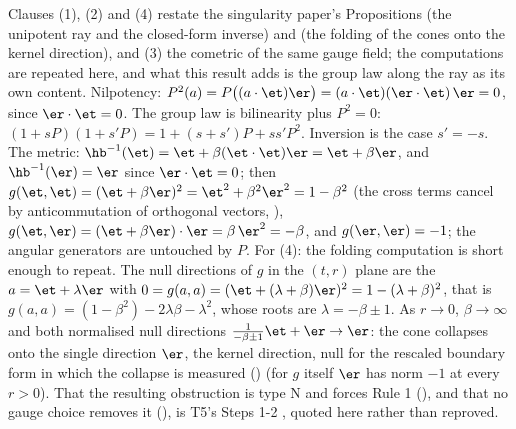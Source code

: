 Clauses (1), (2) and (4) restate the singularity paper's Propositions  (the unipotent ray and the closed-form inverse) and  (the folding of the cones onto the kernel direction), and (3) the cometric of the same gauge field; the computations are repeated here, and what this result adds is the group law along the ray as its own content. Nilpotency: $P^2(a) = P\bigl((a\cdot\et)\er\bigr) = (a\cdot\et)(\er\cdot\et)\,\er = 0$, since $\er \cdot \et = 0$. The group law is bilinearity plus $P^2 = 0$: $(1 + sP)(1 + s'P) = 1 + (s + s')P + ss'P^2$. Inversion is the case $s' = -s$. The metric: $\hb^{-1}(\et) = \et + \beta(\et\cdot\et)\er = \et + \beta\er$, and $\hb^{-1}(\er) = \er$ since $\er \cdot \et = 0$; then $g(\et,\et) = (\et + \beta\er)^2 = \et^2 + \beta^2\er^2 = 1 - \beta^2$ (the cross terms cancel by anticommutation of orthogonal vectors, ), $g(\et,\er) = (\et + \beta\er)\cdot\er = \beta\,\er^2 = -\beta$, and $g(\er,\er) = -1$; the angular generators are untouched by $P$. For (4): the folding computation is short enough to repeat. The null directions of $g$ in the $(t,r)$ plane are the $a = \et + \lambda\er$ with $0 = g(a,a) = (\et + (\lambda + \beta)\er)^{2} = 1 - (\lambda + \beta)^{2}$, that is $g(a,a) = (1-\beta^2) - 2\lambda\beta - \lambda^2$, whose roots are $\lambda = -\beta \pm 1$. As $r \to 0$, $\beta \to \infty$ and both normalised null directions $\tfrac{1}{-\beta\pm1}\et + \er \to \er$: the cone collapses onto the single direction $\er$, the kernel direction, null for the rescaled boundary form in which the collapse is measured \cite[Prop.~2.6]{ButlerT5} () (for $g$ itself $\er$ has norm $-1$ at every $r > 0$). That the resulting obstruction is type N and forces Rule 1 (), and that no gauge choice removes it (), is T5's Steps 1-2 \cite{ButlerT5}, quoted here rather than reproved.
